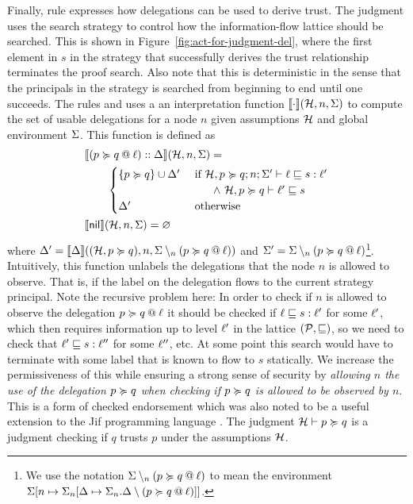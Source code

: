 Finally, rule  expresses how delegations can be used to derive trust. The judgment uses the search strategy to control how the information-flow lattice should be searched. This is shown in Figure~\ref{fig:act-for-judgment-del}, where the first element in $s$ in the strategy that successfully derives the trust relationship terminates the proof search. Also note that this is deterministic in the sense that the principals in the strategy is searched from beginning to end until one succeeds. The rules  and  uses a an interpretation function $\llbracket \cdot \rrbracket(\mathcal{H}, n, \Sigma)$ to compute the set of usable delegations for a node $n$ given assumptions $\mathcal{H}$ and global environment $\Sigma$. This function is defined as
\begin{align}\label{eq:interpret-del}
&\llbracket (\lb{\level}{p \actsfor q}) :: \scope \rrbracket(\Assumps, n, \env) = \\ \nonumber &\qquad  \begin{cases}
\{ p \actsfor q \} \cup \scope' & \text{ if } \flowstoquery{\Assumps, p \actsfor q; n; \env'}{\level}{s}{\level'} \\ &\qquad \wedge\ \nopostflowstoquery{\Assumps, p \actsfor q}{\level'}{s} \\
\scope' & \text{ otherwise}
\end{cases}
\\ \nonumber
&\llbracket \nil \rrbracket(\Assumps, n, \env) = \varnothing
\end{align}
where $\Delta' = \llbracket \Delta \rrbracket((\mathcal{H}, p \succcurlyeq q), n, \Sigma \setminus_n (p \succcurlyeq q \mathbin{@} \ell))$ and $\Sigma' = \Sigma \setminus_n (p \succcurlyeq q \mathbin{@} \ell)$\footnote{We use the notation $\Sigma \setminus_n (p \succcurlyeq q \mathbin{@} \ell)$ to mean the environment $\Sigma \lbrack n \mapsto \Sigma_n \lbrack \Delta \mapsto \Sigma_n.\Delta \setminus (p \succcurlyeq q \mathbin{@} \ell) \rbrack \rbrack$.}. Intuitively, this function unlabels the delegations that the node $n$ is allowed to observe. That is, if the label on the delegation flows to the current strategy principal. Note the recursive problem here: In order to check if $n$ is allowed to observe the delegation $p \succcurlyeq q \mathbin{@} \ell$ it should be checked if $\ell \sqsubseteq s : \ell'$ for some $\ell'$, which then requires information up to level $\ell'$ in the lattice $(\mathcal{P}, \sqsubseteq)$, so we need to check that $\ell' \sqsubseteq s : \ell''$ for some $\ell''$, etc. At some point this search would have to terminate with some label that is known to flow to $s$ statically. We increase the permissiveness of this while ensuring a strong sense of security by \emph{allowing $n$ the use of the delegation $p \succcurlyeq q$ when checking if $p \succcurlyeq q$ is allowed to be observed by $n$}. This is a form of checked endorsement \cite{DBLP:journals/corr/abs-1107-5594} which was also noted to be a useful extension to the Jif programming language \cite{Chong:2007:SWA:1294261.1294265}. The judgment $\mathcal{H} \vdash p \succcurlyeq q$ is a judgment checking if $q$ trusts $p$ under the assumptions $\mathcal{H}$.

